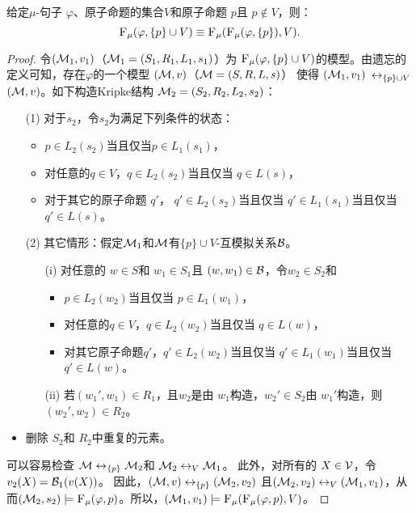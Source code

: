\begin{proposition}[分解性]\label{chapter06:disTF}  给定$\mu$-句子 $\varphi$、原子命题的集合$V$和原子命题 $p$且 $p \notin V$，则：
	\[
	{\textsc{F}_{\textsc{$\mu$}}}(\varphi, \{p\} \cup V) \equiv {\textsc{F}_{\textsc{$\mu$}}}({\textsc{F}_{\textsc{$\mu$}}}(\varphi, \{p\}), V).
	\]
\end{proposition}
\begin{proof}
	令$({\cal M}_1,v_1)$（${\cal M}_1=(S_1, R_1, L_1, s_1)$）为 ${\textsc{F}_{\textsc{$\mu$}}}(\varphi, \{p\} \cup V)$的模型。由遗忘的定义可知，存在$\varphi$的一个模型 $({\cal M},v)$（${\cal M} = (S, R,L, s)$） 使得 $({\cal M}_1,v_1)$ $\leftrightarrow_{\{p\} \cup V}$ $({\cal M},v)$。如下构造Kripke结构 ${\cal M}_2 = (S_2, R_2, L_2, s_2)$：
	\begin{itemize}
		\item[(1)] 对于$s_2$，令$s_2$为满足下列条件的状态：
		\begin{itemize}
			\item $p \in L_2(s_2)$当且仅当$p \in L_1(s_1)$，
			\item 对任意的$q \in V$，$q \in L_2(s_2)$当且仅当 $q\in L(s)$，
			\item 对于其它的原子命题 $q'$， $q' \in L_2(s_2)$当且仅当 $q' \in L_1(s_1)$当且仅当 $q'\in L(s)$。
		\end{itemize}
		\item[(2)] 其它情形：假定${\cal M}_1$和${\cal M}$有$\{p\} \cup V$-互模拟关系${\cal B}$。
		\begin{itemize}
			\item[(i)] 对任意的 $w \in S$和 $w_1 \in S_1$且 $(w,w_1)\in {\cal B}$，令$w_2 \in S_2$和
			\begin{itemize}
				\item $p \in L_2(w_2)$当且仅当 $p \in L_1(w_1)$，
				\item 对任意的$q \in V$，$q \in L_2(w_2)$当且仅当 $q\in L(w)$，
				\item 对其它原子命题$q'$，$q' \in L_2(w_2)$当且仅当 $q' \in L_1(w_1)$当且仅当 $q'\in L(w)$。
			\end{itemize}
			\item[(ii)] 若$(w_1', w_1)\in R_1$，且$w_2$是由 $w_1$构造，$w_2'\in S_2$由 $w_1'$构造，则$(w_2', w_2)\in R_2$。
		\end{itemize}
		\item 删除 $S_2$和 $R_2$中重复的元素。
	\end{itemize}
	可以容易检查 ${\cal M} \leftrightarrow_{\{p\}} {\cal M}_2$和 ${\cal M}_2 \leftrightarrow_V {\cal M}_1$。
	此外，对所有的 $X \in {\cal V}$，令$v_2(X) = {\cal B}_1(v(X))$。
	因此，$({\cal M},v) \leftrightarrow_{\{p\}} ({\cal M}_2,v_2)$ 且$({\cal M}_2,v_2) \leftrightarrow_V ({\cal M}_1,v_1)$，从而$({\cal M}_2, s_2) \models {\textsc{F}_{\textsc{$\mu$}}}(\varphi, p)$。所以，$({\cal M}_1, v_1) \models {\textsc{F}_{\textsc{$\mu$}}}({\textsc{F}_{\textsc{$\mu$}}}(\varphi, p), V)$。
	

\end{proof}

